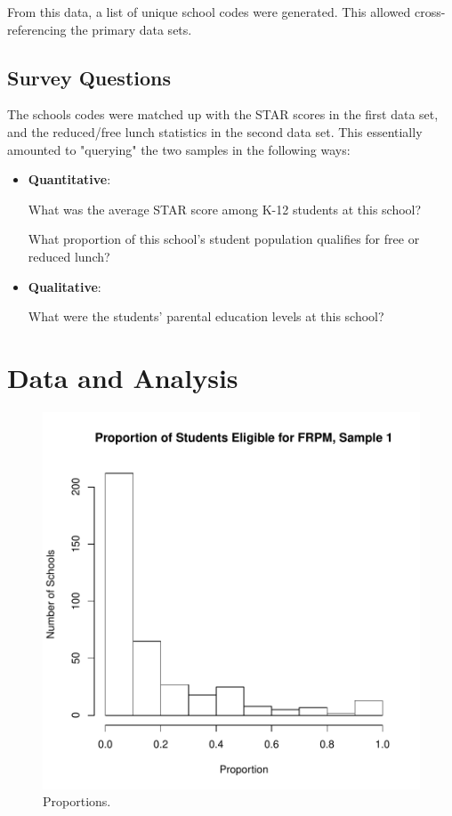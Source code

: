 \documentclass[twocolumn,english]{IEEEtran}
\theoremstyle{plain}
\theoremstyle{plain}
\begin{document}
From this data, a list of unique school codes were generated. 
This allowed cross-referencing the primary data sets.






\subsection{Survey Questions}

The schools codes were matched up with the STAR scores in the first data set, and the reduced/free lunch statistics in the second data set. 
This essentially amounted to "querying" the two samples in the following ways:

\begin{itemize}
		\item \textbf{Quantitative}:

				What was the average STAR score among K-12 students at this school?

				What proportion of this school's student population qualifies for free or reduced lunch?
		\item \textbf{Qualitative}:

				What were the students' parental education levels at this school?
\end{itemize}






\section{Data and Analysis}

\begin{figure}[H]
\begin{centering}
\includegraphics{proj3-fig_lunch_props2}
\caption{Proportions.}
\label{fig:Lunch_Hist_Two}
\end{centering}
\end{figure}
\end{document}
